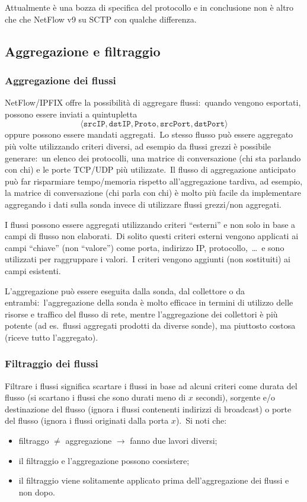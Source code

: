Attualmente è una bozza di specifica del protocollo e in conclusione non è altro che che NetFlow v9 su SCTP con qualche differenza.

\subsection{Aggregazione e filtraggio}

\subsubsection{Aggregazione dei flussi}

NetFlow/IPFIX offre la possibilità di aggregare flussi:\ quando vengono esportati, possono essere inviati a quintupletta \[\langle \mathtt{srcIP}, \mathtt{dstIP}, \mathtt{Proto}, \mathtt{srcPort}, \mathtt{dstPort}\rangle\] oppure possono essere mandati aggregati.\
Lo stesso flusso può essere aggregato più volte utilizzando criteri diversi, ad esempio da flussi grezzi è possibile generare:\ un elenco dei protocolli, una matrice di conversazione (chi sta parlando con chi) e le porte TCP/UDP più utilizzate.\
Il flusso di aggregazione anticipato può far risparmiare tempo/memoria rispetto all'aggregazione tardiva, ad esempio, la matrice di conversazione (chi parla con chi) è molto più facile da implementare aggregando i dati sulla sonda invece di utilizzare flussi grezzi/non aggregati.\

I flussi possono essere aggregati utilizzando criteri ``esterni'' e non solo in base a campi di flusso non elaborati.\
Di solito questi criteri esterni vengono applicati ai campi ``chiave'' (non ``valore'') come porta, indirizzo IP, protocollo,\ \dots\ e sono utilizzati per raggruppare i valori.\
I criteri vengono aggiunti (non sostituiti) ai campi esistenti.

L'aggregazione può essere eseguita dalla sonda, dal collettore o da entrambi:\ l'aggregazione della sonda è molto efficace in termini di utilizzo delle risorse e traffico del flusso di rete, mentre l'aggregazione dei collettori è più potente (ad es.\ flussi aggregati prodotti da diverse sonde), ma piuttosto costosa (riceve tutto l'aggregato).

\subsubsection{Filtraggio dei flussi}

Filtrare i flussi significa scartare i flussi in base ad alcuni criteri come durata del flusso (si scartano i flussi che sono durati meno di $x$ secondi), sorgente e/o destinazione del flusso (ignora i flussi contenenti indirizzi di broadcast) o porte del flusso (ignora i flussi originati dalla porta $x$).\
Si noti che:\
\begin{itemize}
    \item filtraggo $\neq$ aggregazione $\rightarrow$ fanno due lavori diversi;
    \item il filtraggio e l'aggregazione possono coesistere;
    \item il filtraggio viene solitamente applicato prima dell'aggregazione dei flussi e non dopo.
\end{itemize}

